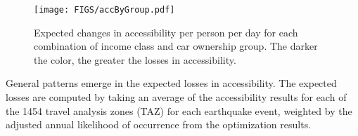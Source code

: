 \begin{figure}[h!]
    \centering
    \texttt{[image: FIGS/accByGroup.pdf]}
\caption{Expected changes in accessibility per person per day for each combination of income class and car ownership group. The darker the color, the greater the losses in accessibility.}%
\label{fig:acc_by_segment}
\end{figure}


General patterns emerge in the expected losses in accessibility.
The expected losses are computed by taking an average of the accessibility results for each of the 1454 travel analysis zones (TAZ) for each earthquake event, weighted by the adjusted annual likelihood of occurrence from the optimization results. 

